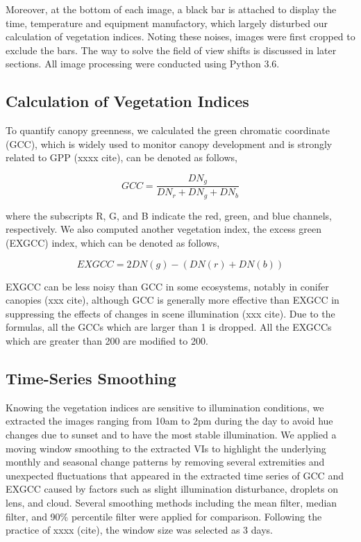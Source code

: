 \documentclass{article}
\begin{document}
Moreover, at the bottom of each image, a black bar is attached to display the time, temperature and equipment manufactory, which largely disturbed our calculation of vegetation indices. Noting these noises, images were first cropped to exclude the bars. The way to solve the field of view shifts is discussed in later sections. All image processing were conducted using Python 3.6. 


\subsection{Calculation of Vegetation Indices}
To quantify canopy greenness, we calculated the green chromatic coordinate (GCC), which is widely used to monitor canopy development and is strongly related to GPP (xxxx cite), can be denoted as follows,

\begin{equation}
GCC = \frac{DN_g}{{DN_r + DN_g + DN_b}}
\end{equation}

where the subscripts R, G, and B indicate the red, green, and blue channels, respectively. 
We also computed another vegetation index, the excess green (EXGCC) index, which can be denoted as follows, 

\begin{equation}
EXGCC=2DN(g)-(DN(r)+DN(b)) 
\end{equation}

EXGCC can be less noisy than GCC in some ecosystems, notably in conifer canopies (xxx cite), although GCC is generally more effective than EXGCC in suppressing the effects of changes in scene illumination (xxx cite). Due to the formulas, all the GCCs which are larger than 1 is dropped. All the EXGCCs which are greater than 200 are modified to 200. 


\subsection{Time-Series Smoothing}
Knowing the vegetation indices are sensitive to illumination conditions, we extracted the images ranging from 10am to 2pm during the day to avoid hue changes due to sunset and to have the most stable illumination. We applied a moving window smoothing to the extracted VIs to highlight the underlying monthly and seasonal change patterns by removing several extremities and unexpected fluctuations that appeared in the extracted time series of GCC and EXGCC caused by factors such as slight illumination disturbance, droplets on lens, and cloud. Several smoothing methods including the mean filter, median filter, and 90\% percentile filter were applied for comparison. Following the practice of xxxx (cite), the window size was selected as 3 days. 
\end{document}
